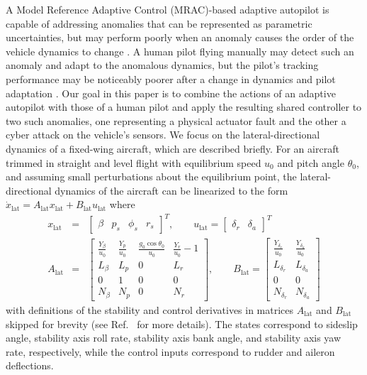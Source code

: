 A Model Reference Adaptive Control (MRAC)-based adaptive autopilot is capable of addressing anomalies that can be represented as parametric uncertainties, but may perform poorly when an anomaly causes the order of the vehicle dynamics to change \cite{narendra2012stable, lavretsky2013robust}. A human pilot flying manually may detect such an anomaly and adapt to the anomalous dynamics, but the pilot's tracking performance may be noticeably poorer after a change in dynamics and pilot adaptation \cite{hess2015modeling, zaal2016manual}. Our goal in this paper is to combine the actions of an adaptive autopilot with those of a human pilot and apply the resulting shared controller to two such anomalies, one representing a physical actuator fault and the other a cyber attack on the vehicle's sensors. We focus on the lateral-directional dynamics of a fixed-wing aircraft, which are described briefly. For an aircraft trimmed in straight and level flight with equilibrium speed $u_0$ and pitch angle $\theta_0$, and assuming small perturbations about the equilibrium point, the lateral-directional dynamics of the aircraft can be linearized to the form $\dot{x}_{\mathrm{lat}} = A_{\mathrm{lat}} x_{\mathrm{lat}} + B_{\mathrm{lat}} u_{\mathrm{lat}}$ where
\begin{eqnarray}
	x_{\mathrm{lat}} &=& \begin{bmatrix}\beta & p_s & \phi_s & r_s \end{bmatrix}^T, \qquad u_{\mathrm{lat}} = \begin{bmatrix}\delta_r & \delta_a \end{bmatrix}^T \nonumber \\
	A_{\mathrm{lat}} &=& \begin{bmatrix}
			\frac{Y_\beta}{u_0} & \frac{Y_p}{u_0} & \frac{g_0\cos{\theta_0}}{u_0} & \frac{Y_r}{u_0} - 1 \\
			L_\beta & L_p & 0 & L_r \\
			0 & 1 & 0 & 0 \\
			N_\beta & N_p & 0 & N_r
		\end{bmatrix}, \qquad B_{\mathrm{lat}} = \begin{bmatrix}
			\frac{Y_{\delta_r}}{u_0} & \frac{Y_{\delta_a}}{u_0} \\
			L_{\delta_r} & L_{\delta_a} \\
			0 & 0 \\
			N_{\delta_r} & N_{\delta_a} 
		\end{bmatrix}
\end{eqnarray}
\noindent with definitions of the stability and control derivatives in matrices $A_{\mathrm{lat}}$ and $B_{\mathrm{lat}}$ skipped for brevity (see Ref.~\cite{lavretsky2013robust} for more details). The states correspond to sideslip angle, stability axis roll rate, stability axis bank angle, and stability axis yaw rate, respectively, while the control inputs correspond to rudder and aileron deflections.

